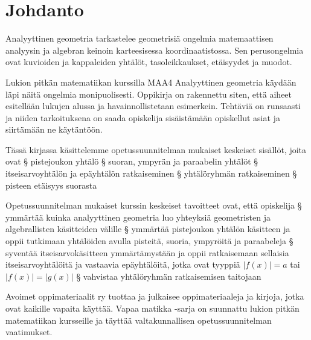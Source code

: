 \chapter{Johdanto}

Analyyttinen geometria tarkastelee geometrisiä ongelmia matemaattisen analyysin ja algebran keinoin karteesisessa koordinaatistossa. Sen perusongelmia ovat kuvioiden ja kappaleiden yhtälöt, tasoleikkaukset, etäisyydet ja muodot.

Lukion pitkän matematiikan kurssilla MAA4 Analyyttinen geometria käydään läpi näitä ongelmia monipuolisesti. Oppikirja on rakennettu siten, että aiheet esitellään lukujen alussa ja havainnollistetaan esimerkein. Tehtäviä on runsaasti ja niiden tarkoituksena on saada opiskelija sisäistämään opiskellut asiat ja siirtämään ne käytäntöön.

Tässä kirjassa käsittelemme opetussuunnitelman mukaiset keskeiset sisällöt, joita ovat
\luettelo
§ pistejoukon yhtälö
§ suoran, ympyrän ja paraabelin yhtälöt
§ itseisarvoyhtälön ja epäyhtälön ratkaiseminen
§ yhtälöryhmän ratkaiseminen
§ pisteen etäisyys suorasta
\loppu

Opetussuunnitelman mukaiset kurssin keskeiset tavoitteet ovat, että opiskelija
\luettelo
§ ymmärtää kuinka analyyttinen geometria luo yhteyksiä geometristen ja algebrallisten
käsitteiden välille 
§ ymmärtää pistejoukon yhtälön käsitteen ja oppii tutkimaan yhtälöiden avulla pisteitä,
suoria, ympyröitä ja paraabeleja 
§ syventää itseisarvokäsitteen ymmärtämystään ja oppii ratkaisemaan sellaisia itseisarvoyhtälöitä ja vastaavia epäyhtälöitä, jotka ovat tyyppiä $|f(x)|=a$ tai $|f(x)|=|g(x)|$
§ vahvistaa yhtälöryhmän ratkaisemisen taitojaan
\loppu

Avoimet oppimateriaalit ry tuottaa ja julkaisee oppimateriaaleja ja kirjoja, jotka ovat kaikille vapaita käyttää. Vapaa matikka -sarja on suunnattu lukion pitkän matematiikan kursseille ja täyttää valtakunnallisen opetussuunnitelman vaatimukset.
